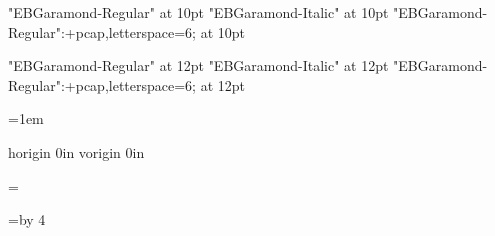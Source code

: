 




\font\tenrm "EBGaramond-Regular" at 10pt\relax
\font\tenit "EBGaramond-Italic" at 10pt\relax
\font\tensc "EBGaramond-Regular":+pcap,letterspace=6; at 10pt\relax

\font\twelverm "EBGaramond-Regular" at 12pt\relax
\font\twelveit "EBGaramond-Italic" at 12pt\relax
\font\twelvesc "EBGaramond-Regular":+pcap,letterspace=6; at 12pt\relax

\def\normalsize{%
	\gdef\rm{\tenrm}%
	\gdef\it{\tenit}%
	\gdef\sc{\tensc}%
}

\def\bigsize{%
	\gdef\rm{\twelverm}%
	\gdef\it{\twelveit}%
	\gdef\sc{\twelvesc}%
}

\let\emph\it

\normalsize\rm



\baselineskip=15pt

\frenchspacing

\parskip=0pt

\parindent=1em

\emergencystretch=8pt

\def\firstnoindent{\global\everypar={\wipeeverypar\setbox7=\lastbox}}
\def\wipeeverypar{\global\everypar={}}


\pagewidth=180mm	
\pageheight=200mm

\pdfvariable horigin 0in	
\pdfvariable vorigin 0in

\hoffset=15mm	
\voffset=15mm

\topskip=\baselineskip

\hsize=120mm	
\vsize=\topskip \advance\vsize by 4\baselineskip


